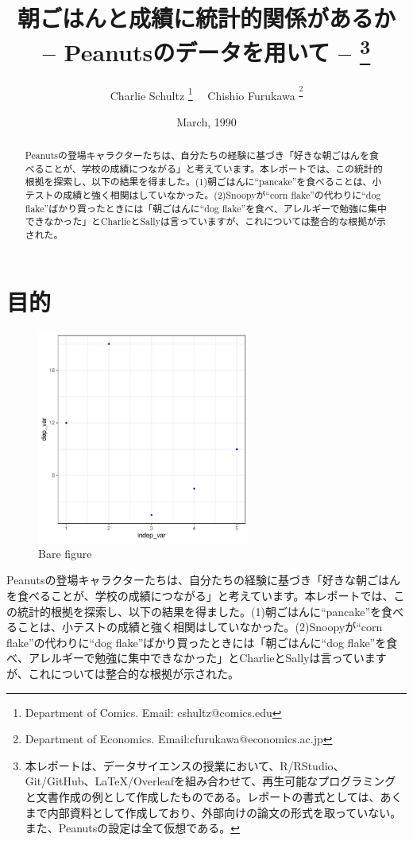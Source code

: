 \documentclass[xelatex,ja=standard]{bxjsarticle}
\title{朝ごはんと成績に統計的関係があるか \\ -- Peanutsのデータを用いて -- \thanks{本レポートは、データサイエンスの授業において、R/RStudio、Git/GitHub、LaTeX/Overleafを組み合わせて、再生可能なプログラミングと文書作成の例として作成したものである。レポートの書式としては、あくまで内部資料として作成しており、外部向けの論文の形式を取っていない。また、Peanutsの設定は全て仮想である。}}
\author{Charlie Schultz
\thanks{Department of Comics. Email: cshultz@comics.edu}  \ \  Chishio Furukawa
\textsuperscript\thanks{Department of Economics. Email:cfurukawa@economics.ac.jp}}
\date{March, 1990}
\begin{document}
\renewcommand\footnotelayout{\small}
\sffamily\mdseries

\maketitle

\vspace{-10pt}\begin{abstract}
\begin{spacing}{1}
\noindent 
Peanutsの登場キャラクターたちは、自分たちの経験に基づき「好きな朝ごはんを食べることが、学校の成績につながる」と考えています。本レポートでは、この統計的根拠を探索し、以下の結果を得ました。(1)朝ごはんに``pancake''を食べることは、小テストの成績と強く相関はしていなかった。(2)Snoopyが``corn flake''の代わりに``dog flake''ばかり買ったときには「朝ごはんに``dog flake''を食べ、アレルギーで勉強に集中できなかった」とCharlieとSallyは言っていますが、これについては整合的な根拠が示された。\\

\end{spacing}
\end{abstract}

\newpage

\section{目的}



\begin{figure}
\centering
\includegraphics[width=7cm]{04_analyze/scatter_regress/figure/figure.pdf}

\label{fig:img1}
\caption{Bare figure}
\end{figure}

\mcfamily\mdseries





Peanutsの登場キャラクターたちは、自分たちの経験に基づき「好きな朝ごはんを食べることが、学校の成績につながる」と考えています。本レポートでは、この統計的根拠を探索し、以下の結果を得ました。(1)朝ごはんに``pancake''を食べることは、小テストの成績と強く相関はしていなかった。(2)Snoopyが``corn flake''の代わりに``dog flake''ばかり買ったときには「朝ごはんに``dog flake''を食べ、アレルギーで勉強に集中できなかった」とCharlieとSallyは言っていますが、これについては整合的な根拠が示された。


 

\end{document}

